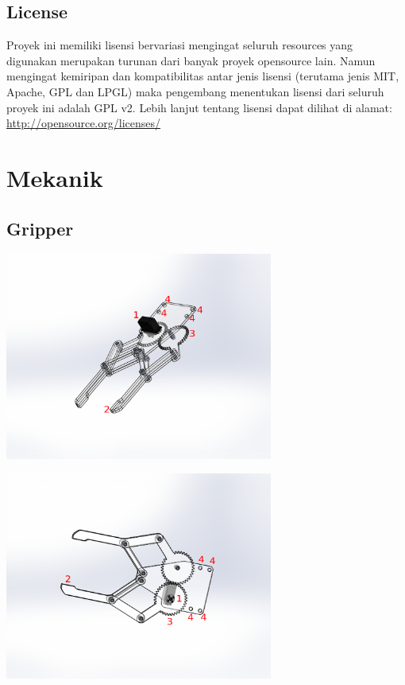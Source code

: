 \documentclass[11pt,fleqn]{book} %
\begin{document}
\section{License}
\hspace{10pt} Proyek ini memiliki lisensi bervariasi mengingat seluruh resources yang digunakan merupakan turunan dari banyak proyek opensource lain.
Namun mengingat kemiripan dan kompatibilitas antar jenis lisensi (terutama jenis MIT, Apache, GPL dan LPGL) maka pengembang menentukan lisensi dari seluruh proyek ini adalah GPL v2.
Lebih lanjut tentang lisensi dapat dilihat di alamat: \url{http://opensource.org/licenses/}

\newpage
{} %
\chapter{Mekanik}
\section{Gripper}
\begin{center}
 \includegraphics[width=250pt]{./screenshot/arm/GA}\\
\end{center}
\begin{center}
 \includegraphics[width=250pt]{./screenshot/arm/GA1}\\
\end{center}
\end{document}
